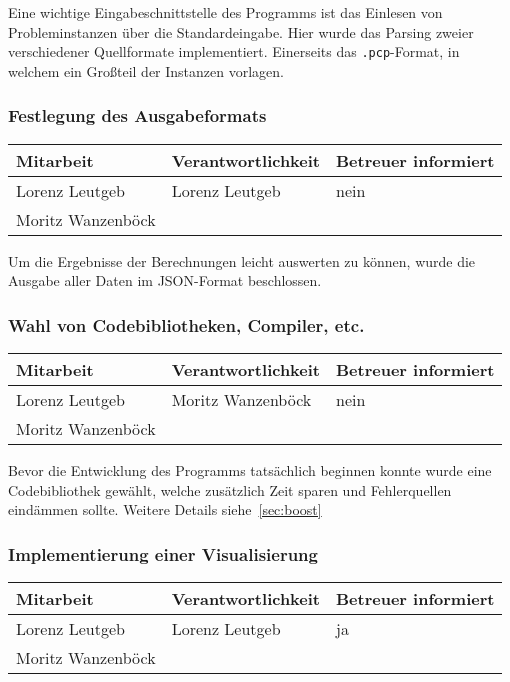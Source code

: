 Eine wichtige Eingabeschnittstelle des Programms ist das Einlesen von Probleminstanzen über die Standardeingabe. Hier wurde das Parsing zweier verschiedener Quellformate implementiert. Einerseits das \texttt{.pcp}-Format, in welchem ein Großteil der Instanzen vorlagen.%

\subsubsection{ Festlegung des Ausgabeformats}

\begin{center}
\begin{tabular}{lll}
	Mitarbeit & Verantwortlichkeit & Betreuer informiert \\
	\hline
	Lorenz Leutgeb & Lorenz Leutgeb & nein \\
	Moritz Wanzenböck & & \\
\end{tabular}
\end{center}

Um die Ergebnisse der Berechnungen leicht auswerten zu können, wurde die Ausgabe aller Daten im JSON-Format beschlossen.

\subsubsection{ Wahl von Codebibliotheken, Compiler, etc.}

\begin{center}
\begin{tabular}{lll}
	Mitarbeit & Verantwortlichkeit & Betreuer informiert \\
	\hline
	Lorenz Leutgeb & Moritz Wanzenböck & nein \\
	Moritz Wanzenböck & & \\
\end{tabular}
\end{center}

Bevor die Entwicklung des Programms tatsächlich beginnen konnte wurde eine Code\-bi\-bli\-othek gewählt, welche zusätzlich Zeit sparen und Fehlerquellen eindämmen sollte. Weitere Details siehe~\ref{sec:boost}

\subsubsection{ Implementierung einer Visualisierung}

\begin{center}
\begin{tabular}{lll}
	Mitarbeit & Verantwortlichkeit & Betreuer informiert \\
	\hline
	Lorenz Leutgeb & Lorenz Leutgeb & ja \\
	Moritz Wanzenböck & & \\
\end{tabular}
\end{center}

